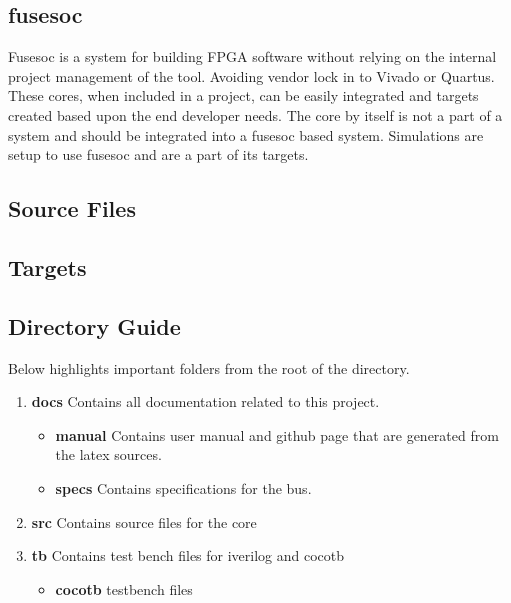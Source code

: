 \subsection{fusesoc}
\par
Fusesoc is a system for building FPGA software without relying on the internal project management of the tool. Avoiding vendor lock in to Vivado or Quartus.
These cores, when included in a project, can be easily integrated and targets created based upon the end developer needs. The core by itself is not a part of
a system and should be integrated into a fusesoc based system. Simulations are setup to use fusesoc and are a part of its targets.

\subsection{Source Files}



\subsection{Targets}



\subsection{Directory Guide}

\par
Below highlights important folders from the root of the directory.

\begin{enumerate}
  \item \textbf{docs} Contains all documentation related to this project.
    \begin{itemize}
      \item \textbf{manual} Contains user manual and github page that are generated from the latex sources.
      \item \textbf{specs} Contains specifications for the bus.
    \end{itemize}
  \item \textbf{src} Contains source files for the core
  \item \textbf{tb} Contains test bench files for iverilog and cocotb
    \begin{itemize}
      \item \textbf{cocotb} testbench files
    \end{itemize}
\end{enumerate}


